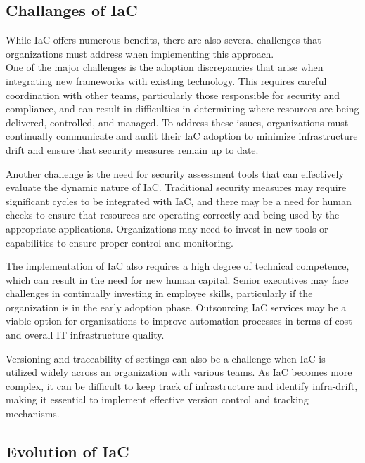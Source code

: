 \subsection{Challanges of IaC}

While IaC offers numerous benefits, there are also several challenges that organizations must address when implementing this approach.\\
One of the major challenges is the adoption discrepancies that arise when integrating new frameworks with existing technology. This requires careful coordination with other teams, particularly those responsible for security and compliance, and can result in difficulties in determining where resources are being delivered, controlled, and managed. To address these issues, organizations must continually communicate and audit their IaC adoption to minimize infrastructure drift and ensure that security measures remain up to date.

Another challenge is the need for security assessment tools that can effectively evaluate the dynamic nature of IaC. Traditional security measures may require significant cycles to be integrated with IaC, and there may be a need for human checks to ensure that resources are operating correctly and being used by the appropriate applications. Organizations may need to invest in new tools or capabilities to ensure proper control and monitoring.

The implementation of IaC also requires a high degree of technical competence, which can result in the need for new human capital. Senior executives may face challenges in continually investing in employee skills, particularly if the organization is in the early adoption phase. Outsourcing IaC services may be a viable option for organizations to improve automation processes in terms of cost and overall IT infrastructure quality.

Versioning and traceability of settings can also be a challenge when IaC is utilized widely across an organization with various teams. As IaC becomes more complex, it can be difficult to keep track of infrastructure and identify infra-drift, making it essential to implement effective version control and tracking mechanisms.




\subsection{Evolution of IaC}

